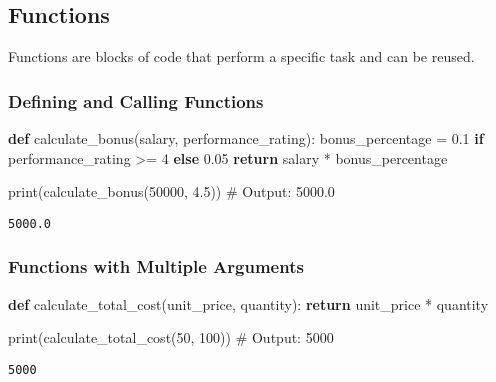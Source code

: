 \documentclass[
  letterpaper,
  DIV=11,
  numbers=noendperiod]{scrreprt}
\newenvironment{Shaded}{\begin{snugshade}}{\end{snugshade}}
\newcommand{\BuiltInTok}[1]{\textcolor[rgb]{0.00,0.23,0.31}{#1}}
\newcommand{\CommentTok}[1]{\textcolor[rgb]{0.37,0.37,0.37}{#1}}
\newcommand{\ControlFlowTok}[1]{\textcolor[rgb]{0.00,0.23,0.31}{\textbf{#1}}}
\newcommand{\DecValTok}[1]{\textcolor[rgb]{0.68,0.00,0.00}{#1}}
\newcommand{\FloatTok}[1]{\textcolor[rgb]{0.68,0.00,0.00}{#1}}
\newcommand{\KeywordTok}[1]{\textcolor[rgb]{0.00,0.23,0.31}{\textbf{#1}}}
\newcommand{\NormalTok}[1]{\textcolor[rgb]{0.00,0.23,0.31}{#1}}
\newcommand{\OperatorTok}[1]{\textcolor[rgb]{0.37,0.37,0.37}{#1}}
\begin{document}
\subsection{Functions}\label{functions}

Functions are blocks of code that perform a specific task and can be
reused.

\subsubsection{Defining and Calling
Functions}\label{defining-and-calling-functions}

\begin{Shaded}
\begin{Highlighting}[]
\KeywordTok{def}\NormalTok{ calculate\_bonus(salary, performance\_rating):}
\NormalTok{    bonus\_percentage }\OperatorTok{=} \FloatTok{0.1} \ControlFlowTok{if}\NormalTok{ performance\_rating }\OperatorTok{\textgreater{}=} \DecValTok{4} \ControlFlowTok{else} \FloatTok{0.05}
    \ControlFlowTok{return}\NormalTok{ salary }\OperatorTok{*}\NormalTok{ bonus\_percentage}

\BuiltInTok{print}\NormalTok{(calculate\_bonus(}\DecValTok{50000}\NormalTok{, }\FloatTok{4.5}\NormalTok{))  }\CommentTok{\# Output: 5000.0}
\end{Highlighting}
\end{Shaded}

\begin{verbatim}
5000.0
\end{verbatim}

\subsubsection{Functions with Multiple
Arguments}\label{functions-with-multiple-arguments}

\begin{Shaded}
\begin{Highlighting}[]
\KeywordTok{def}\NormalTok{ calculate\_total\_cost(unit\_price, quantity):}
    \ControlFlowTok{return}\NormalTok{ unit\_price }\OperatorTok{*}\NormalTok{ quantity}

\BuiltInTok{print}\NormalTok{(calculate\_total\_cost(}\DecValTok{50}\NormalTok{, }\DecValTok{100}\NormalTok{))  }\CommentTok{\# Output: 5000}
\end{Highlighting}
\end{Shaded}

\begin{verbatim}
5000
\end{verbatim}
\end{document}

